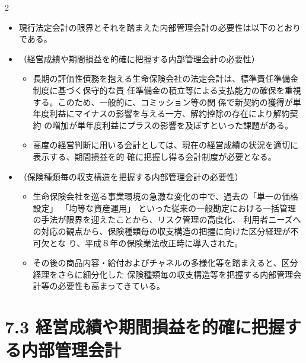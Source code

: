 2\documentclass[report,gutter=10mm,fore-edge=10mm,uplatex,dvipdfmx]{jlreq}
\begin{document}
\begin{itemize}
 \item[] 現行法定会計の限界とそれを踏まえた内部管理会計の必要性は以下のとおりである。\\
\item[] （経営成績や期間損益を的確に把握する内部管理会計の必要性）
\begin{itemize}
  \item[] 長期の評価性債務を抱える生命保険会社の法定会計は、標準責任準備金制度に基づく保守的な責
 任準備金の積立等による支払能力の確保を重視する。このため、一般的に、コミッション等の関
 係で新契約の獲得が単年度利益にマイナスの影響を与える一方、解約控除の存在により解約契約
 の増加が単年度利益にプラスの影響を及ぼすといった課題がある。
 \item[] 高度の経営判断に用いる会計としては、現在の経営成績の状況を適切に表示する、期間損益を的
 確に把握し得る会計制度が必要となる。\\
\end{itemize} 
\item[]（保険種類毎の収支構造を把握する内部管理会計の必要性）
\begin{itemize}
  \item[] 生命保険会社を巡る事業環境の急激な変化の中で、過去の「単一の価格設定」
 「均等な資産運用」
 といった従来の一般勘定における一括管理の手法が限界を迎えたことから、リスク管理の高度化、
 利用者ニーズへの対応の観点から、保険種類毎の収支構造の把握に向けた区分経理が不可欠とな
 り、平成８年の保険業法改正時に導入された。
 \item[] その後の商品内容・給付およびチャネルの多様化等を踏まえると、区分経理をさらに細分化した
 保険種類毎の収支構造等を把握する内部管理会計等の必要性も高まってきている。
\end{itemize}
\end{itemize}
\section{7.3 経営成績や期間損益を的確に把握する内部管理会計}
\end{document}
